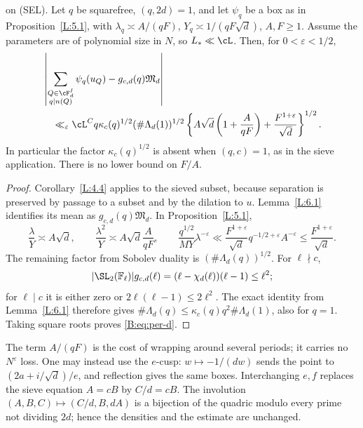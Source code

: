 \begin{theorem}\label{L:6.2}
 on (SEL). Let \(q\) be squarefree, \((q,2d)=1\),
and let \(\psi_q\) be a box as in Proposition~\ref{L:5.1}, with
\(\lambda_q\asymp A/(qF)\), \(Y_q\asymp1/(qF\sqrt d)\), \(A,F\ge1\).
Assume the parameters are of polynomial size in \(N\), so \(L_*\ll\cL\).
Then, for \(0<\varepsilon<1/2\),
\begin{align}\label{B:eq:per-d}
 &\left|\sum_{\substack{Q\in\cF_d^I\\q\mid n(Q)}}\psi_q(u_Q)
             -g_{c,d}(q)\mathfrak M_d\right|\notag\\
 &\quad\ll_\varepsilon \cL^C q\kappa_c(q)^{1/2}(\#\Lambda_d(1))^{1/2}
   \left\{A\sqrt d\left(1+\frac A{qF}\right)
                     +\frac{F^{1+\varepsilon}}{\sqrt d}\right\}^{1/2}.
\end{align}
In particular the factor \(\kappa_c(q)^{1/2}\) is absent when \((q,c)=1\),
as in the sieve application. There is no lower bound on \(F/A\).
\end{theorem}
\begin{proof}
Corollary~\ref{L:4.4} applies to the sieved subset, because separation
is preserved by passage to a subset and by the dilation to \(u\).
Lemma~\ref{L:6.1} identifies its mean as \(g_{c,d}(q)\mathfrak M_d\).
In Proposition~\ref{L:5.1},
\[
 \frac\lambda Y\asymp A\sqrt d,\qquad
 \frac{\lambda^2}Y\asymp A\sqrt d\frac A{qF},\qquad
 \frac{q^{1/2}}{MY}\lambda^{-\varepsilon}
 \ll\frac{F^{1+\varepsilon}}{\sqrt d}
                 q^{-1/2+\varepsilon}A^{-\varepsilon}
 \le\frac{F^{1+\varepsilon}}{\sqrt d}.
\]
The remaining factor from Sobolev duality is \((\#\Lambda_d(q))^{1/2}\).
For \(\ell\nmid c\),
\[
 |\SL_2(\mathbb F_\ell)|g_{c,d}(\ell)
       =(\ell-\chi_d(\ell))(\ell-1)\le\ell^2;
\]
for \(\ell\mid c\) it is either zero or \(2\ell(\ell-1)\le2\ell^2\).
The exact identity from Lemma~\ref{L:6.1} therefore gives
\(\#\Lambda_d(q)\le\kappa_c(q)q^2\#\Lambda_d(1)\), also for \(q=1\).
Taking square roots proves \eqref{B:eq:per-d}.
\end{proof}

The term \(A/(qF)\) is the cost of wrapping around several periods;
it carries no \(N^\varepsilon\) loss. One may instead use the \(e\)-cusp:
\(w\mapsto-1/(dw)\) sends the point to
\((2a+i/\sqrt d)/e\), and reflection gives the same boxes.
Interchanging \(e,f\) replaces the sieve equation \(A=cB\) by
\(C/d=cB\). The involution
\((A,B,C)\mapsto(C/d,B,dA)\) is a bijection of the quadric modulo every
prime not dividing \(2d\); hence the densities and the estimate are
unchanged.

